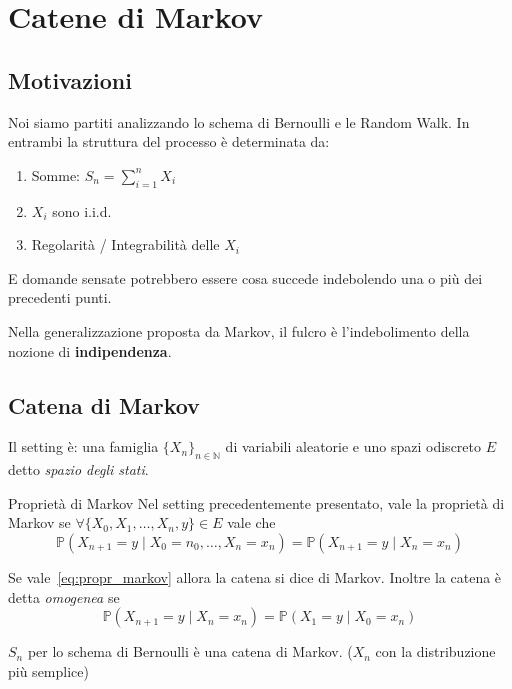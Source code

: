 \chapter{Catene di Markov}

\section{Motivazioni}

Noi siamo partiti analizzando lo schema di Bernoulli e le Random Walk. In
entrambi la struttura del processo è determinata da:
\begin{enumerate}[label = \arabic*.]
    \item Somme: \(S_{n} = \sum_{i=1}^{n} X_{i} \) 
    \item \(X_{i}\) sono i.i.d.
    \item Regolarità / Integrabilità delle \(X_{i}\) 
\end{enumerate}
E domande sensate potrebbero essere cosa succede indebolendo una o più dei
precedenti punti.

Nella generalizzazione proposta da Markov, il fulcro è l'indebolimento della
nozione di \textbf{indipendenza}.

\section{Catena di Markov}

Il setting è: una famiglia \(\{X_{n}\}_{n \in \mathbb{N}} \) di variabili
aleatorie e uno spazi odiscreto \(E\) detto \emph{spazio degli stati}. 

\begin{definition}{Proprietà di Markov}
    Nel setting precedentemente presentato, vale la proprietà di Markov se
    \(\forall \{X_{0}, X_{1}, \dots, X_{n}, y\} \in E\) vale che
    \begin{equation}\label{eq:propr_markov}
       \mathbb{P}{(X_{n+1}
      = y \;|\; X_{0} = n_{0}, \dots, X_{n} = x_{n})} = \mathbb{P}{(X_{n+1} = y
  \;|\; X_{n} = x_{n})}
    \end{equation}

Se vale~\eqref{eq:propr_markov} allora la catena si dice di Markov. Inoltre la
catena è detta \emph{omogenea} se
\[
  \mathbb{P}{(X_{n+1} = y \;|\; X_{n} = x_{n})} = \mathbb{P}{(X_{1} = y \;|\;
  X_{0} = x_{n})}
\]

\end{definition}

\begin{example}{}
    \(S_{n}\) per lo schema di Bernoulli è una catena di Markov. (\(X_{n}\) con
    la distribuzione più semplice)
\end{example}


